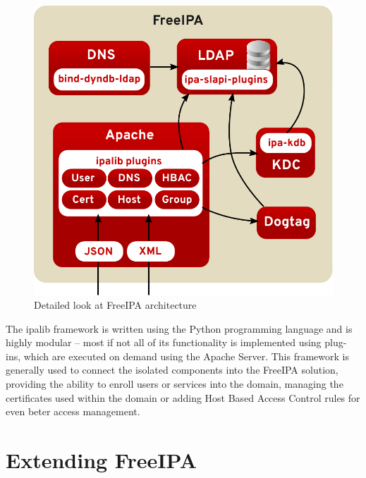 \begin{figure}[!ht]
    \centering
        \includegraphics[scale=0.6]{fig/freeipa-detail}
    \caption{Detailed look at FreeIPA architecture}
    \label{fig:ipaDetail}
\end{figure}

The ipalib framework is written using the Python programming language and is highly modular -- most if not all of its functionality is implemented using plug-ins, which are executed on demand using the Apache Server.
This framework is generally used to connect the isolated components into the FreeIPA solution, providing the ability to enroll users or services into the domain, managing the certificates used within the domain or
adding Host Based Access Control rules for even beter access management.

\section{Extending FreeIPA}
\label{sec:ipaExt}

